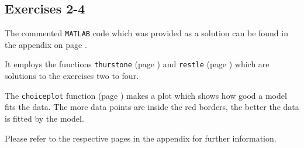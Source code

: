 \documentclass[../main/Notes.tex]{subfiles}
\begin{document}
\subsection*{Exercises 2-4}
The commented \texttt{MATLAB} code which was provided as a solution can be found in the appendix on page \pageref{app:matlabcode_ex8_2_show}\label{back:matlabcode_ex8_2_show}.

It employs the functions \texttt{thurstone} (page \pageref{app:matlabcode_ex8_2_thurstone}\label{back:matlabcode_ex8_2_thurstone}) and \texttt{restle} (page \pageref{app:matlabcode_ex8_2_restle}\label{back:matlabcode_ex8_2_restle}) which are solutions to the exercises two to four.

The \texttt{choiceplot} function (page \pageref{app:matlabcode_ex8_2_choiceplot}\label{back:matlabcode_ex8_2_choiceplot}) makes a plot which shows how good a model fits the data. The more data points are inside the red borders, the better the data is fitted by the model.

Please refer to the respective pages in the appendix for further information.
\end{document}
